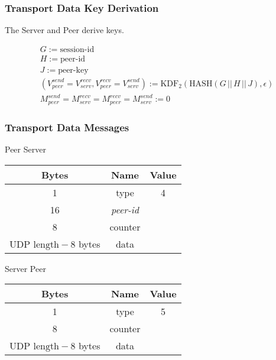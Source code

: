 \subsubsection{Transport Data Key Derivation}

The Server and Peer derive keys.

\begin{align*}
    &  G:= \text{session-id}                                                               \\
    &  H := \text{peer-id}                                                                \\
    &  J := \text{peer-key}                                                              \\
    &  (V_{peer}^{send} = V_{serv}^{recv}, V_{peer}^{recv} = V_{serv}^{send}) := \text{KDF}_2(\text{HASH}(G\,
    ||\, H\,||\, J), \epsilon)                                        \\
    &   M_{peer}^{send} = M_{serv}^{recv} = M_{peer}^{recv} = M_{serv}^{send} := 0
\end{align*}

\subsubsection{Transport Data Messages}

\begin{center}
    Peer \textrightarrow Server\\
    \begin{tabular}{|c|c|c|}
        \hline
        \textbf{Bytes}                & \textbf{Name}  & \textbf{Value} \\
        \hline
        1                             & type           & 4              \\
        \hline
        16                            & \emph{peer-id} &                \\
        \hline
        8                             & counter        &                \\
        \hline
        $\text{UDP length} - 8$ bytes & data           &                \\
        \hline
    \end{tabular}
\end{center}

\begin{center}
    Server \textrightarrow Peer\\
    \begin{tabular}{|c|c|c|}
        \hline
        \textbf{Bytes}                & \textbf{Name} & \textbf{Value} \\
        \hline
        1                             & type          & 5              \\
        \hline
        8                             & counter       &                \\
        \hline
        $\text{UDP length} - 8$ bytes & data          &                \\
        \hline
    \end{tabular}
\end{center}


